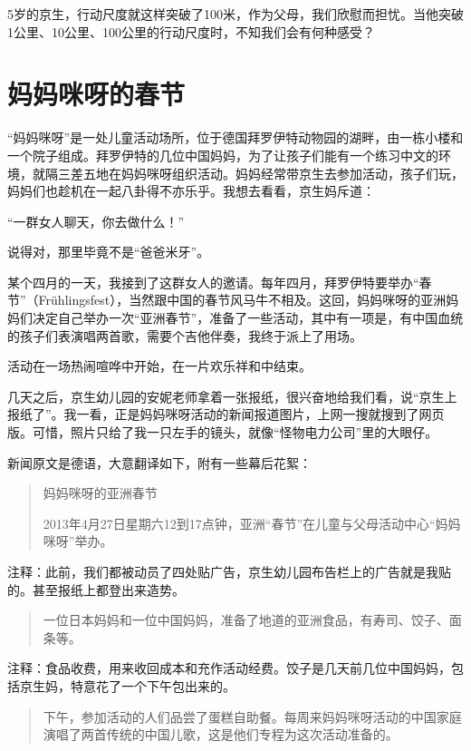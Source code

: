\documentclass[twoside,openright,headings=optiontohead]{ctexbook} %
\begin{document}
{5岁的京生，行动尺度就这样突破了100米，作为父母，我们欣慰而担忧。当他突破1公里、10公里、100公里的行动尺度时，不知我们会有何种感受？

\chapter*{妈妈咪呀的春节}\label{mamamia}

``妈妈咪呀''是一处儿童活动场所，位于德国拜罗伊特动物园的湖畔，由一栋小楼和一个院子组成。拜罗伊特的几位中国妈妈，为了让孩子们能有一个练习中文的环境，就隔三差五地在妈妈咪呀组织活动。妈妈经常带京生去参加活动，孩子们玩，妈妈们也趁机在一起八卦得不亦乐乎。我想去看看，京生妈斥道：

``一群女人聊天，你去做什么！''

说得对，那里毕竟不是``爸爸米牙''。

某个四月的一天，我接到了这群女人的邀请。每年四月，拜罗伊特要举办``春节''（Frühlingsfest），当然跟中国的春节风马牛不相及。这回，妈妈咪呀的亚洲妈妈们决定自己举办一次``亚洲春节''，准备了一些活动，其中有一项是，有中国血统的孩子们表演唱两首歌，需要个吉他伴奏，我终于派上了用场。

活动在一场热闹喧哗中开始，在一片欢乐祥和中结束。

几天之后，京生幼儿园的安妮老师拿着一张报纸，很兴奋地给我们看，说``京生上报纸了''。我一看，正是妈妈咪呀活动的新闻报道图片，上网一搜就搜到了网页版。可惜，照片只给了我一只左手的镜头，就像``怪物电力公司''里的大眼仔。

新闻原文是德语，大意翻译如下，附有一些幕后花絮：

\begin{quote}
妈妈咪呀的亚洲春节

2013年4月27日星期六12到17点钟，亚洲``春节''在儿童与父母活动中心``妈妈咪呀''举办。
\end{quote}

注释：此前，我们都被动员了四处贴广告，京生幼儿园布告栏上的广告就是我贴的。甚至报纸上都登出来造势。

\begin{quote}
一位日本妈妈和一位中国妈妈，准备了地道的亚洲食品，有寿司、饺子、面条等。
\end{quote}

注释：食品收费，用来收回成本和充作活动经费。饺子是几天前几位中国妈妈，包括京生妈，特意花了一个下午包出来的。

\begin{quote}
下午，参加活动的人们品尝了蛋糕自助餐。每周来妈妈咪呀活动的中国家庭演唱了两首传统的中国儿歌，这是他们专程为这次活动准备的。
\end{quote}

}
\end{document}
